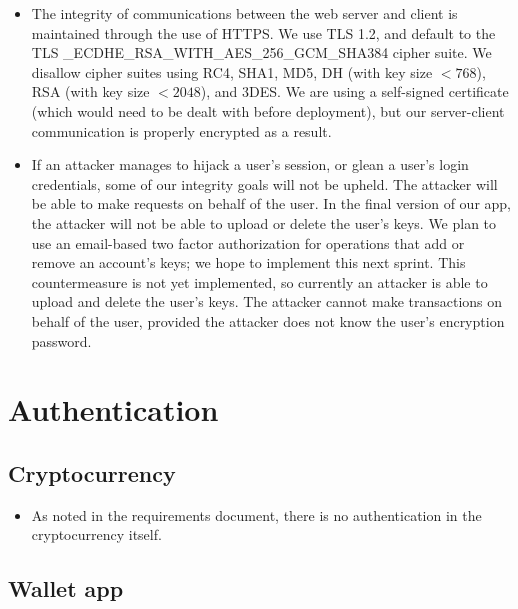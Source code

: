 \documentclass[a4paper,12pt]{article}
\begin{document}
\begin{itemize}
\item The integrity of communications between the web server and client is maintained through the use of HTTPS. We use TLS 1.2, and default to the TLS \_ECDHE\_RSA\_WITH\_AES\_256\_GCM\_SHA384 cipher suite.
We disallow cipher suites using RC4, SHA1, MD5, DH (with key size $< 768$), RSA (with key size $< 2048$), and 3DES. We are using a self-signed certificate (which would need to be dealt with before deployment), but our server-client communication is properly encrypted as a result.
\item If an attacker manages to hijack a user's session, or glean a user's login credentials, some of our integrity goals will not be upheld.
The attacker will be able to make requests on behalf of the user.
In the final version of our app, the attacker will not be able to upload or delete the user's keys.
We plan to use an email-based two factor authorization for operations that add or remove an account's keys; we hope to implement this next sprint.
This countermeasure is not yet implemented, so currently an attacker is able to upload and delete the user's keys.
The attacker cannot make transactions on behalf of the user, provided the attacker does not know the user's encryption password.
\end{itemize}

\section{Authentication}

\subsection{Cryptocurrency}

\begin{itemize}
\item As noted in the requirements document, there is no authentication in the cryptocurrency itself.
\end{itemize}

\subsection{Wallet app}
\end{document}
